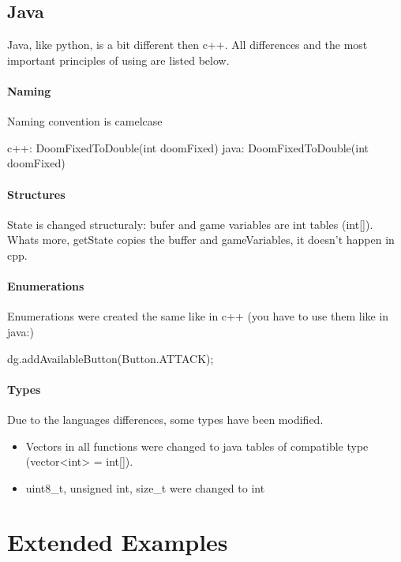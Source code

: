 \subsection{Java}
Java, like python, is a bit different then c++. All differences and the most important principles of using are listed below.

\paragraph {Naming}
 Naming convention is camelcase 
\begin{clinee}
c++: DoomFixedToDouble(int doomFixed)
java: DoomFixedToDouble(int doomFixed)
\end{clinee}
\paragraph {Structures}
State is changed structuraly: bufer and game variables are int tables (int[]). Whats more, getState copies the buffer and gameVariables, it doesn't happen in cpp. 
\paragraph {Enumerations}
 Enumerations were created the same like in c++ (you have to use them like in java:)
\begin{clinee}
 dg.addAvailableButton(Button.ATTACK);
\end{clinee}
\paragraph {Types}
Due to the languages differences, some types have been modified.
\begin{itemize}
\item Vectors in all functions were changed to java tables of compatible type (vector<int> = int[]).
\item uint8\_t, unsigned int, size\_t were changed to int
\end{itemize}
\section{Extended Examples}
